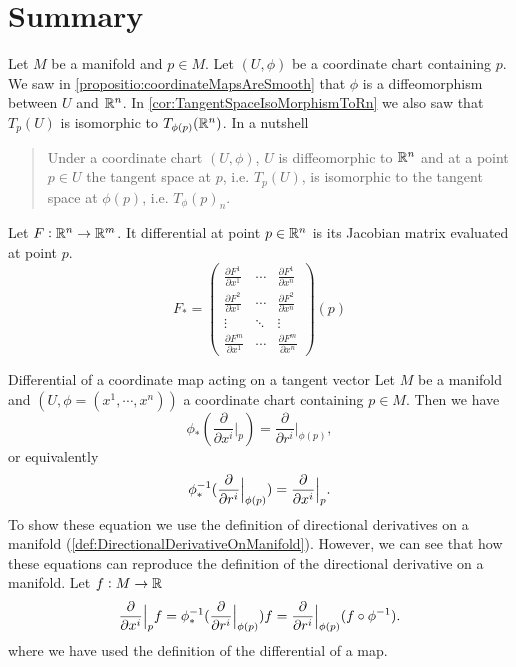 \newpage




\section{Summary}
\begin{summary}
	Let $ M $ be a manifold and $ p \in M $. Let $ (U,\phi) $ be a coordinate chart containing $ p $. We saw in \autoref{propositio:coordinateMapsAreSmooth} that $ \phi $ is a diffeomorphism between $ U $ and $ \mathbb{R}^n $. In \autoref{cor:TangentSpaceIsoMorphismToRn} we also saw that $ T_p(U) $ is isomorphic to $ T_{\phi(p)}(\mathbb{R}^n) $. In a nutshell
	\begin{quote}
		Under a coordinate chart $ (U,\phi) $, $ U $ is diffeomorphic to $ \mathbb{R}^n $ and at a point $ p \in U $ the tangent space at $ p $, i.e. $ T_p(U) $, is isomorphic to the tangent space at $ \phi(p) $, i.e. $ T_\phi(p)_n $.
	\end{quote}
\end{summary}

\begin{summary}
	Let $ F: \mathbb{R}^n \to \mathbb{R}^m $. It differential at point $ p \in \mathbb{R}^n $ is its Jacobian matrix evaluated at point $ p $.
	\[ F_* = 
	\begin{pmatrix}
		\frac{\partial F^1}{\partial x^1} & \cdots & \frac{\partial F^1}{\partial x^n} \\
		\frac{\partial F^2}{\partial x^1} & \cdots & \frac{\partial F^2}{\partial x^n} \\
		\vdots & \ddots & \vdots \\
		\frac{\partial F^m}{\partial x^1} & \cdots & \frac{\partial F^m}{\partial x^n}
	\end{pmatrix}(p)
	 \]
\end{summary}

\begin{summary}{Differential of a coordinate map acting on a tangent vector}
	Let $ M $ be a manifold and $ (U,\phi = (x^1,\cdots,x^n)) $ a coordinate chart containing $ p \in M $. Then we have
	\[ \phi_*(\frac{\partial}{\partial  x^i}\big|_{p}) = \frac{\partial}{\partial  r^i}\big|_{\phi(p)} ,\]
	or equivalently
	\[ \phi_*^{-1}(\frac{\partial}{\partial  r^i}\big|_{\phi(p)}) = \frac{\partial}{\partial  x^i}\big|_{p}. \]
	To show these equation we use the definition of directional derivatives on a manifold (\autoref{def:DirectionalDerivativeOnManifold}). However, we can see that how these equations can reproduce the definition of the directional derivative on a manifold. Let $ f:M \to \mathbb{R} $
	\[ \frac{\partial}{\partial  x^i}\big|_{p} f = \phi_*^{-1}(\frac{\partial}{\partial  r^i}\big|_{\phi(p)})f = \frac{\partial}{\partial  r^i}\big|_{\phi(p)}(f\circ\phi^{-1}).  \]
	where we have used the definition of the differential of a map.
\end{summary}

